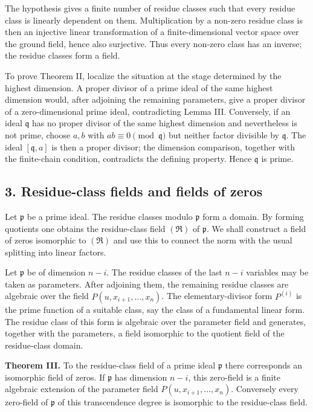 \documentclass[11pt]{article}
\begin{document}
The hypothesis gives a finite number of residue classes such that every residue class is linearly dependent on them. Multiplication by a non-zero residue class is then an injective linear transformation of a finite-dimensional vector space over the ground field, hence also surjective. Thus every non-zero class has an inverse; the residue classes form a field.

To prove Theorem II, localize the situation at the stage determined by the highest dimension. A proper divisor of a prime ideal of the same highest dimension would, after adjoining the remaining parameters, give a proper divisor of a zero-dimensional prime ideal, contradicting Lemma III. Conversely, if an ideal $\mathfrak q$ has no proper divisor of the same highest dimension and nevertheless is not prime, choose $a,b$ with $ab\equiv0\pmod{\mathfrak q}$ but neither factor divisible by $\mathfrak q$. The ideal $[\mathfrak q,a]$ is then a proper divisor; the dimension comparison, together with the finite-chain condition, contradicts the defining property. Hence $\mathfrak q$ is prime.

\subsection{3. Residue-class fields and fields of zeros}

Let $\mathfrak p$ be a prime ideal. The residue classes modulo $\mathfrak p$ form a domain. By forming quotients one obtains the residue-class field $(\mathfrak R)$ of $\mathfrak p$. We shall construct a field of zeros isomorphic to $(\mathfrak R)$ and use this to connect the norm with the usual splitting into linear factors.

Let $\mathfrak p$ be of dimension $n-i$. The residue classes of the last $n-i$ variables may be taken as parameters. After adjoining them, the remaining residue classes are algebraic over the field $P(u,x_{i+1},\ldots,x_n)$. The elementary-divisor form $P^{(i)}$ is the prime function of a suitable class, say the class of a fundamental linear form. The residue class of this form is algebraic over the parameter field and generates, together with the parameters, a field isomorphic to the quotient field of the residue-class domain.

\textbf{Theorem III.} To the residue-class field of a prime ideal $\mathfrak p$ there corresponds an isomorphic field of zeros. If $\mathfrak p$ has dimension $n-i$, this zero-field is a finite algebraic extension of the parameter field $P(u,x_{i+1},\ldots,x_n)$. Conversely every zero-field of $\mathfrak p$ of this transcendence degree is isomorphic to the residue-class field.
\end{document}
